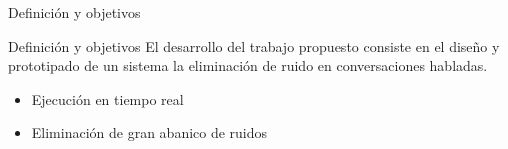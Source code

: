 \begin{frame}{Definición y objetivos}
	\begin{block}{\centering \footnotesize Definición y objetivos}
		El desarrollo del trabajo propuesto consiste en el diseño y prototipado de un sistema la eliminación de ruido en conversaciones habladas.
		\begin{itemize}
			\item Ejecución en tiempo real
			\item Eliminación de gran abanico de ruidos
		\end{itemize}
	\end{block}
\end{frame}